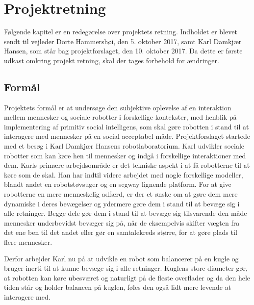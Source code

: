 \chapter{Projektretning}
\label{ProjektRetning}
%
Følgende kapitel er en redegørelse over projektets retning. Indholdet er blevet sendt til vejleder Dorte Hammershøi, den 5. oktober 2017, samt Karl Damkjær Hansen, som står bag projektforslaget, den 10. oktober 2017. Da dette er første udkast omkring projekt retning, skal der tages forbehold for ændringer.
%
\section{Formål}
\label{ProjektRetningFormaal}
%
Projektets formål er at undersøge den subjektive oplevelse af en interaktion mellem mennesker og sociale robotter i forskellige kontekster, med henblik på implementering af primitiv social intelligens, som skal gøre robotten i stand til at interagere med mennesker på en social acceptabel måde.\blankline
%
Projektforslaget startede med et besøg i Karl Damkjær Hansens robotlaboratorium. Karl udvikler sociale robotter som kan køre hen til mennesker og indgå i forskellige interaktioner med dem. Karls primære arbejdsområde er det tekniske aspekt i at få robotterne til at køre som de skal. Han har indtil videre arbejdet med nogle forskellige modeller, blandt andet en robotstøvsuger og en segway lignende platform. For at give robotterne en mere menneskelig adfærd, er der et ønske om at gøre dem mere dynamiske i deres bevægelser og ydermere gøre dem i stand til at bevæge sig i alle retninger. Begge dele gør dem i stand til at bevæge sig tilsvarende den måde mennesker underbevidst bevæger sig på, når de eksempelvis skifter vægten fra det ene ben til det andet eller gør en samtalekreds større, for at gøre plads til flere mennesker. 

Derfor arbejder Karl nu på at udvikle en robot som balancerer på en kugle og bruger inerti til at kunne bevæge sig i alle retninger. Kuglens store diameter gør, at robotten kan køre ubesværet og naturligt på de fleste overflader og da den hele tiden står og holder balancen på kuglen, føles den også lidt mere levende at interagere med.
%
